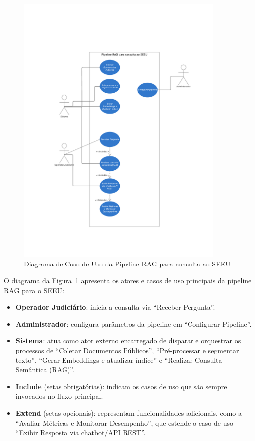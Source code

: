 \begin{description}
\begin{figure}[H]
  \centering
  \includegraphics[width=0.9\textwidth]{04-figuras/diagrama_em_branco.pdf}
  \caption{Diagrama de Caso de Uso da Pipeline RAG para consulta ao SEEU}
  \label{fig:diagrama-rag-seeu}
\end{figure}

\noindent
O diagrama da Figura~\ref{fig:diagrama-rag-seeu} apresenta os atores e casos de uso principais da pipeline RAG para o SEEU:  
\begin{itemize}
  \item \textbf{Operador Judiciário}: inicia a consulta via “Receber Pergunta”.  
  \item \textbf{Administrador}: configura parâmetros da pipeline em “Configurar Pipeline”.  
  \item \textbf{Sistema}: atua como ator externo encarregado de disparar e orquestrar os processos de “Coletar Documentos Públicos”, “Pré-processar e segmentar texto”, “Gerar Embeddings e atualizar índice” e “Realizar Consulta Semântica (RAG)”.  
  \item \textbf{Include} (setas obrigatórias): indicam os casos de uso que são sempre invocados no fluxo principal.  
  \item \textbf{Extend} (setas opcionais): representam funcionalidades adicionais, como a “Avaliar Métricas e Monitorar Desempenho”, que estende o caso de uso “Exibir Resposta via chatbot/API REST”.  
\end{itemize}  



\end{description}

